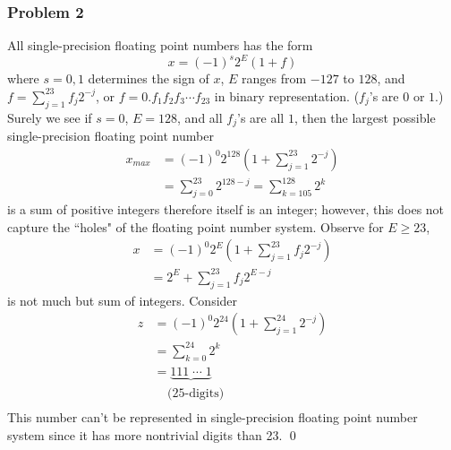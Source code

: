 \documentclass[12pt,a4paper]{article}
\renewcommand{\l}{\left}\renewcommand{\r}{\right}
\newcommand{\SUM}[2]{\sum\limits_{#1}^{#2}}
\begin{document}
\newpage\subsubsection*{Problem 2}
All single-precision floating point numbers has the form
$$x = (-1)^s 2^E(1+f)$$
where $s = 0, 1$ determines the sign of $x$, $E$ ranges from $-127$ to $128$, and $f = \SUM{j=1}{23} f_j 2^{-j}$, or $f = 0.f_1f_2f_3\cdots f_{23}$ in binary representation. ($f_j$'s are $0$ or $1$.) Surely we see if $s=0$, $E=128$, and all $f_j$'s are all $1$, then the largest possible single-precision floating point number
\begin{align*}
x_{max} &= (-1)^0 2^{128} \l(1 + \SUM{j=1}{23} 2^{-j}\r)\\
&= \SUM{j=0}{23} 2^{128-j}  = \SUM{k=105}{128} 2^k
\end{align*}
is a sum of positive integers therefore itself is an integer; however, this does not capture the ``holes" of the floating point number system. Observe for $E \geq 23$, 
\begin{align*}
x &= (-1)^0 2^{E} \l(1 + \SUM{j=1}{23} f_j 2^{-j}\r)\\
&= 2^E + \SUM{j=1}{23} f_j2^{E-j}
\end{align*}
is not much but sum of integers. Consider 
\begin{align*}
z &= (-1)^0 2^{24}\l(1 + \SUM{j=1}{24} 2^{-j}\r) \\
&= \SUM{k=0}{24}2^k \\
&= \underbrace{111 \; \cdots \; 1} \\
& \;\;\;\;\mbox{(25-digits)} \\
\end{align*}
This number can't be represented in single-precision floating point number system since it has more nontrivial digits than 23.  \qed 
\end{document}
